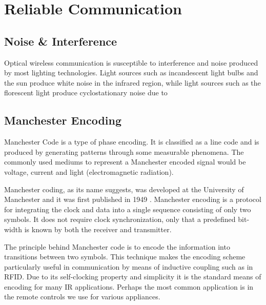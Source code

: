 
\section{Reliable Communication}

\subsection{Noise \& Interference}

Optical wireless communication is susceptible to interference and noise produced by most lighting technologies. Light sources such as incandescent light bulbs and the sun produce white noise in the infrared region, while light sources such as the florescent light produce cyclostationary noise due to 






\subsection{Manchester Encoding}
\label{sec:manchester_encoding}
Manchester Code is a type of phase encoding. It is classified as a line code and is produced by generating patterns through some measurable phenomena. The commonly used mediums to represent a Manchester encoded signal would be voltage, current and light (electromagnetic radiation).

Manchester coding, as its name suggests, was developed at the University of Manchester and it was first published in 1949 \cite{Jameel2019}. Manchester encoding is a protocol for integrating the clock and data into a single sequence consisting of only two symbols. It does not require clock synchronization, only that a predefined bit-width is known by both the receiver and transmitter. 

The principle behind Manchester code is to encode the information into transitions between two symbols. This technique makes the encoding scheme particularly useful in communication by means of inductive coupling such as in RFID. Due to its self-clocking property and simplicity it is the standard means of encoding for many IR applications. Perhaps the most common application is in the remote controls we use for various appliances.

